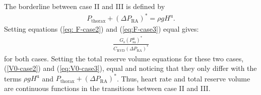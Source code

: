 \documentclass[12pt]{article}
\begin{document}
The borderline between case II and III is defined by
\begin{align}
    P_\text{thorax} + (\Delta P_\text{RA})^*= \rho g H^\text{u}.
\end{align}
Setting equations (\ref{eq: F-case2}) and (\ref{eq:F-case3}) equal gives:
\begin{align}
    \frac{G_\text{s}(P_\text{sa}^\text{u})^*}{C_\text{RVD}(\Delta P_\text{RA})^*}
\end{align}
for both cases. 
Setting the total reserve volume equations for these two cases, (\ref{V0-case2}) and (\ref{eq:V0-case3}), equal and noticing that they only differ with the terms $\rho g H^\text{u}$ and $P_\text{thorax} + (\Delta P_\text{RA})^*$. Thus, heart rate and total reserve volume are continuous functions in the transitions between case II and III. 
\end{document}
